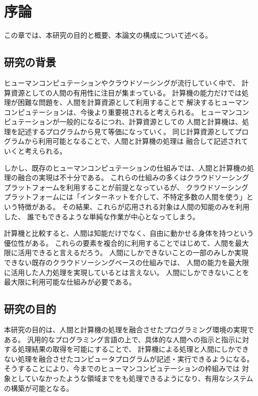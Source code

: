 \chapter{序論}\label{chap:introduction}

この章では、本研究の目的と概要、本論文の構成について述べる。

\newpage

\section{研究の背景}\label{ux7814ux7a76ux306eux80ccux666f}

ヒューマンコンピュテーションやクラウドソーシングが流行していく中で、
計算資源としての人間の有用性に注目が集まっている。
計算機の能力だけでは処理が困難な問題を、人間を計算資源として利用することで
解決するヒューマンコンピュテーションは、今後より重要視されると考えられる。
ヒューマンコンピュテーションが一般的になるにつれ、計算資源としての
人間と計算機は、処理を記述するプログラムから見て等価になっていく。
同じ計算資源としてプログラムから利用可能となることで、人間と計算機の処理は
融合して記述されていくと考えられる。

しかし、既存のヒューマンコンピュテーションの仕組みでは、人間と計算機の処理の融合の実現は不十分である。
これらの仕組みの多くはクラウドソーシングプラットフォームを利用することが前提となっているが、
クラウドソーシングプラットフォームには「インターネットを介して、不特定多数の人間を使う」という特徴がある。
その結果、これらが応用される対象は人間の知能のみを利用した、
誰でもできるような単純な作業が中心となってしまう。

計算機と比較すると、人間は知能だけでなく、自由に動かせる身体を持つという優位性がある。
これらの要素を複合的に利用することではじめて、人間を最大限に活用できると言えるだろう。
人間にしかできないことの一部のみしか実現できない既存のクラウドソーシングベースの仕組みでは、
人間の能力を最大限に活用した人力処理を実現しているとは言えない。
人間にしかできないことを最大限に利用可能な仕組みが必要である。

\section{研究の目的}\label{ux7814ux7a76ux306eux76eeux7684}

本研究の目的は、人間と計算機の処理を融合させたプログラミング環境の実現である。
汎用的なプログラミング言語の上で、具体的な人間への指示と指示に対する処理結果の取得を可能にすることで、
計算機による処理と人間にしかできない処理を融合させたコンピュータプログラムが記述・実行できるようになる。
そうすることにより、今までのヒューマンコンピュテーションの枠組みでは
対象としていなかったような領域までをも処理できるようになり、有用なシステムの構築が可能となる。

